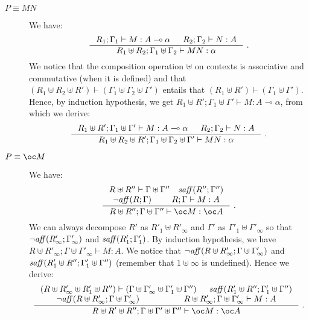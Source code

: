 \documentclass[11pt]{article}
\newcommand{\Gives}{\vdash}             \newcommand{\IGives}{\vdash_{I}}        \newcommand{\AIGives}{\vdash_{{\it AI}}} \newcommand{\CGives}{\vdash_{C}}
\begin{document}
\begin{description}

\item[$P \equiv MN$] We have:
    $$
    \inference
    {R_1;\Gamma_1\vdash M:A\multimap \alpha & R_2;\Gamma_2\vdash N:A}
    {R_1\uplus R_2;\Gamma_1\uplus\Gamma_2\vdash MN:\alpha} ~.
    $$
We notice that the composition operation $\uplus$ on contexts is
associative and commutative (when it is defined) and that 
$(R_1\uplus R_2 \uplus R')\Gives (\Gamma_1\uplus
\Gamma_2\uplus \Gamma')$ entails that 
$(R_1\uplus R') \Gives (\Gamma_1\uplus \Gamma')$. 
Hence, by induction hypothesis, we get 
    $R_1\uplus R';\Gamma_1\uplus\Gamma'\vdash M: A\multimap \alpha$, 
    from which we derive:
    $$
    \inference
    {R_1\uplus R';\Gamma_1\uplus\Gamma'\vdash M :A\multimap \alpha & 
     R_2;\Gamma_2\vdash N:A}
    {R_1\uplus R_2\uplus R';\Gamma_1\uplus\Gamma_2\uplus\Gamma'\vdash
    MN:\alpha} ~.
    $$


\item[$P \equiv \oc M$]  We have:
    $$
    \inference
    {R\uplus R''\vdash \Gamma\uplus\Gamma'' \quad \w{saff}(R'';\Gamma'')\\
      \neg \w{aff}(R;\Gamma) &       R;\Gamma\vdash M:A\\}
    {R\uplus R'';\Gamma\uplus\Gamma''\vdash\oc M:\oc A}~.
    $$
    We can always decompose $R'$ as $R'_1\uplus R'_{\infty}$ and 
    $\Gamma'$ as $\Gamma'_1\uplus\Gamma'_{\infty}$ so that 
    $\neg {\it aff}(R'_{\infty};\Gamma'_{\infty})$ and 
     ${\it saff}(R'_1; \Gamma'_1)$.
    By induction hypothesis, we have $R\uplus
    R'_{\infty};\Gamma\uplus\Gamma'_{\infty}\vdash M:A$.
    We notice that $\neg {\it aff}(R\uplus
    R'_{\infty};\Gamma\uplus\Gamma'_{\infty})$ and 
    ${\it saff}(R'_1\uplus R'';\Gamma'_1\uplus \Gamma'')$ 
    (remember that $1\uplus \infty$ is undefined). Hence 
    we derive:
    $$
    \inference
    {(R\uplus R'_{\infty} \uplus R'_1\uplus R'') \Gives (\Gamma \uplus
      \Gamma'_{\infty} \uplus \Gamma'_1\uplus \Gamma'') & \w{saff}(R'_1\uplus R'';\Gamma'_1\uplus \Gamma'')\\
      \neg \w{aff}(R\uplus R'_{\infty};\Gamma\uplus\Gamma'_{\infty}) &
      R\uplus R'_{\infty};\Gamma\uplus\Gamma'_{\infty} \vdash M:A}
    {R\uplus R'\uplus R'';\Gamma\uplus\Gamma'\uplus\Gamma''\vdash
      \bang M:\bang A}~.
    $$


\end{description}
\end{document}
